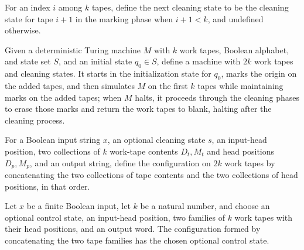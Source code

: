 \begin{definition}
\label{Complexity.LogProg.clNext}
\leanok
{}
For an index $i$ among $k$ tapes, define the next cleaning state to be the cleaning
state for tape $i+1$ in the marking phase when $i+1<k$, and undefined otherwise.
\end{definition}

\begin{definition}
\label{Complexity.LogProg.cleanTM}
\leanok
{}
Given a deterministic Turing machine $M$ with $k$ work tapes, Boolean alphabet, and
state set $S$, and an initial state $q_0\in S$, define a machine with $2k$ work tapes
and cleaning states. It starts in the initialization state for $q_0$, marks the origin
on the added tapes, and then simulates $M$ on the first $k$ tapes while maintaining
marks on the added tapes; when $M$ halts, it proceeds through the cleaning phases to
erase those marks and return the work tapes to blank, halting after the cleaning
process.
\end{definition}

\begin{definition}
\label{Complexity.LogProg.ccfg}
\leanok
{}
For a Boolean input string $x$, an optional cleaning state $s$, an input-head position,
two collections of $k$ work-tape contents $D_t,M_t$ and head positions $D_p,M_p$, and an
output string, define the configuration on $2k$ work tapes by concatenating the two
collections of tape contents and the two collections of head positions, in that order.
\end{definition}

\begin{lemma}
\label{Complexity.LogProg.ccfg_state}
\leanok
{}
Let $x$ be a finite Boolean input, let $k$ be a natural number, and choose an optional
control state, an input-head position, two families of $k$ work tapes with their head
positions, and an output word. The configuration formed by concatenating the two tape
families has the chosen optional control state.
\end{lemma}

